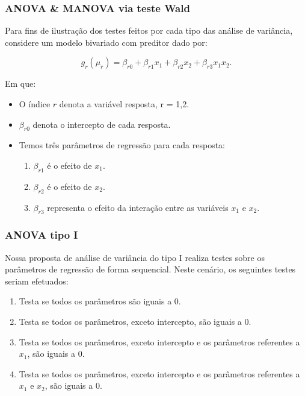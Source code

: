 \documentclass[10pt,
  aspectratio=169,
  serif,
  mathserif,
  professionalfont,
  compress,
  handout,
  ]{beamer}\usepackage[]{graphicx}\usepackage[]{color}
\begin{document}
\begin{frame}

\frametitle{ANOVA \& MANOVA via teste Wald}

Para fins de ilustração dos testes feitos por cada tipo das análise de variância, considere um modelo bivariado com preditor dado por:

\begin{equation}
g_r(\mu_r) = \beta_{r0} + \beta_{r1} x_1 + \beta_{r2} x_2 + \beta_{r3} x_1x_2.
\end{equation}

Em que:

\begin{itemize}
    \itemsep 2ex

  \item O índice $r$ denota a variável resposta, r = 1,2. 

  \item $\beta_{r0}$ denota o intercepto de cada resposta. 

  \item Temos três parâmetros de regressão para cada resposta:
  
  \begin{enumerate}
    
    \item $\beta_{r1}$ é o efeito de $x_1$. 
    
    \item $\beta_{r2}$ é o efeito de $x_2$.
    
    \item $\beta_{r3}$ representa o efeito da interação entre as variáveis $x_1$ e $x_2$.
    
  \end{enumerate}

\end{itemize}

\end{frame}


\begin{frame}

\frametitle{ANOVA tipo I}

Nossa proposta de análise de variância do tipo I realiza testes sobre os parâmetros de regressão de forma sequencial. Neste cenário, os seguintes testes seriam efetuados:

\begin{enumerate}
 \itemsep 2ex
  \item Testa se todos os parâmetros são iguais a 0.
  \item Testa se todos os parâmetros, exceto intercepto, são iguais a 0.
  \item Testa se todos os parâmetros, exceto intercepto e os parâmetros referentes a $x_1$, são iguais a 0.
  \item Testa se todos os parâmetros, exceto intercepto e os parâmetros referentes a $x_1$ e $x_2$, são iguais a 0.
\end{enumerate}

\end{frame}
\end{document}
